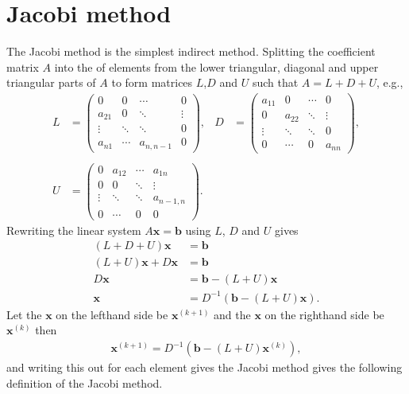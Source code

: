 \documentclass[letterpaper,10pt,english]{jupyterBook}
\begin{document}
\section{Jacobi method}
\label{\detokenize{7_Indirect_methods/7.1_Jacobi_method:jacobi-method}}\label{\detokenize{7_Indirect_methods/7.1_Jacobi_method:jacobi-method-section}}\label{\detokenize{7_Indirect_methods/7.1_Jacobi_method::doc}}
\sphinxAtStartPar
The Jacobi method is the simplest indirect method. Splitting the coefficient matrix \(A\) into the of elements from the lower triangular, diagonal and upper triangular parts of \(A\) to form matrices \(L\),\(D\) and \(U\) such that \(A = L + D + U\), e.g.,
\begin{align*}
    L&=\begin{pmatrix}
        0 & 0 & \cdots  & 0\\
        a_{21}  & 0 & \ddots  & \vdots \\
        \vdots  & \ddots  & \ddots  & 0\\
        a_{n1}  & \cdots  & a_{n,n-1}  & 0
    \end{pmatrix},&
    D&=\begin{pmatrix}
        a_{11}  & 0 & \cdots  & 0\\
        0 & a_{22}  & \ddots  & \vdots \\
        \vdots  & \ddots  & \ddots  & 0\\
        0 & \cdots  & 0 & a_{nn} 
    \end{pmatrix}, \\ \\
    U&=\begin{pmatrix}
        0 & a_{12}  & \cdots  & a_{1n}  \\
        0 & 0 & \ddots  & \vdots  \\
        \vdots  & \ddots  & \ddots  & a_{n-1,n}  \\
        0 & \cdots  & 0 & 0 
    \end{pmatrix}.
\end{align*}
\sphinxAtStartPar
Rewriting the linear system \(A\mathbf{x}=\mathbf{b}\) using \(L\), \(D\) and \(U\) gives
\begin{align*}
    (L+D+U)\mathbf{x}&=\mathbf{b}\\
    (L+U)\mathbf{x}+D\mathbf{x}&=\mathbf{b}\\
    D\mathbf{x}&=\mathbf{b}-(L+U)\mathbf{x}\\
    \mathbf{x}&=D^{-1} (\mathbf{b}-(L+U)\mathbf{x}).
\end{align*}
\sphinxAtStartPar
Let the \(\mathbf{x}\) on the left\sphinxhyphen{}hand side be \(\mathbf{x}^{(k+1)}\) and the \(\mathbf{x}\) on the right\sphinxhyphen{}hand side be \(\mathbf{x}^{(k)}\) then
\begin{equation}\label{equation:7_Indirect_methods/7.1_Jacobi_method:matrix-form-of-the-jacobi-method-equation}
\begin{split}\mathbf{x}^{(k+1)} = D^{-1} (\mathbf{b} - (L + U)\mathbf{x}^{(k)}),\end{split}
\end{equation}
\sphinxAtStartPar
and writing this out for each element gives the Jacobi method gives the following definition of the Jacobi method.
\end{document}
